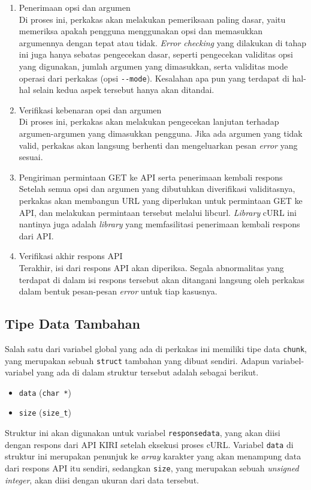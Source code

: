\begin{enumerate}
	\item Penerimaan opsi dan argumen \\
	Di proses ini, perkakas akan melakukan pemeriksaan paling dasar, yaitu memeriksa apakah pengguna menggunakan opsi dan memasukkan argumennya dengan tepat atau tidak. \textit{Error checking} yang dilakukan di tahap ini juga hanya sebatas pengecekan dasar, seperti pengecekan validitas opsi yang digunakan, jumlah argumen yang dimasukkan, serta validitas mode operasi dari perkakas (opsi \verb|--mode|). Kesalahan apa pun yang terdapat di hal-hal selain kedua aspek tersebut hanya akan ditandai.
	\item Verifikasi kebenaran opsi dan argumen \\
	Di proses ini, perkakas akan melakukan pengecekan lanjutan terhadap argumen-argumen yang dimasukkan pengguna. Jika ada argumen yang tidak valid, perkakas akan langsung berhenti dan mengeluarkan pesan \textit{error} yang sesuai.
	\item Pengiriman permintaan GET ke API serta penerimaan kembali respons\\
	Setelah semua opsi dan argumen yang dibutuhkan diverifikasi validitasnya, perkakas akan membangun URL yang diperlukan untuk permintaan GET ke API, dan melakukan permintaan tersebut melalui libcurl. \textit{Library} cURL ini nantinya juga adalah \textit{library} yang memfasilitasi penerimaan kembali respons dari API.
	\item Verifikasi akhir respons API \\
	Terakhir, isi dari respons API akan diperiksa. Segala abnormalitas yang terdapat di dalam isi respons tersebut akan ditangani langsung oleh perkakas dalam bentuk pesan-pesan \textit{error} untuk tiap kasusnya.
\end{enumerate}

\subsection{Tipe Data Tambahan}
\label{sec:design-implementation-customtypes}

Salah satu dari variabel global yang ada di perkakas ini memiliki tipe data \verb|chunk|, yang merupakan sebuah \verb|struct| tambahan yang dibuat sendiri. Adapun variabel-variabel yang ada di dalam struktur tersebut adalah sebagai berikut.

\begin{itemize}
	\item \verb|data| (\verb|char *|)
	\item \verb|size| (\verb|size_t|)
\end{itemize}
\noindent
Struktur ini akan digunakan untuk variabel \verb|responsedata|, yang akan diisi dengan respons dari API KIRI setelah eksekusi proses cURL. Variabel \verb|data| di struktur ini merupakan penunjuk ke \textit{array} karakter yang akan menampung data dari respons API itu sendiri, sedangkan \verb|size|, yang merupakan sebuah \textit{unsigned integer}, akan diisi dengan ukuran dari data tersebut.

